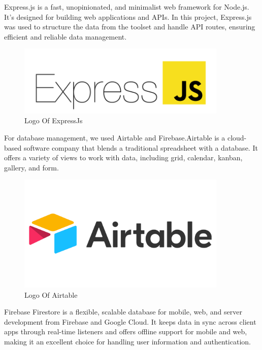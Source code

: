 Express.js is a fast, unopinionated, and minimalist web framework for Node.js. It's designed for building web applications and APIs. In this project, Express.js was used to structure the data from the  toolset and handle API routes, ensuring efficient and reliable data management.

\begin{figure}[H]
    \centering
    \includegraphics[width=10cm]{src/assets/logos/expressJsLogo.png}
    \caption{  Logo Of ExpressJs }
    \label{fig: ExpressJS_Logo}
\end{figure}

\newpage
For database management, we used  {\color{purple}Airtable} \cite{airtable} and  {\color{purple}Firebase}.Airtable is a cloud-based software company that blends a traditional spreadsheet with a database. It offers a variety of views to work with data, including grid, calendar, kanban, gallery, and form. 

\begin{figure}[H]
    \centering
    \includegraphics[width=10cm]{src/assets/logos/airtableLogo.png}
    \caption{  Logo Of Airtable }
    \label{fig: Airtable_Logo}
\end{figure}


Firebase Firestore is a flexible, scalable database for mobile, web, and server development from Firebase and Google Cloud. It keeps data in sync across client apps through real-time listeners and offers offline support for mobile and web, making it an excellent choice for handling user information and authentication.

\vspace{2cm}

